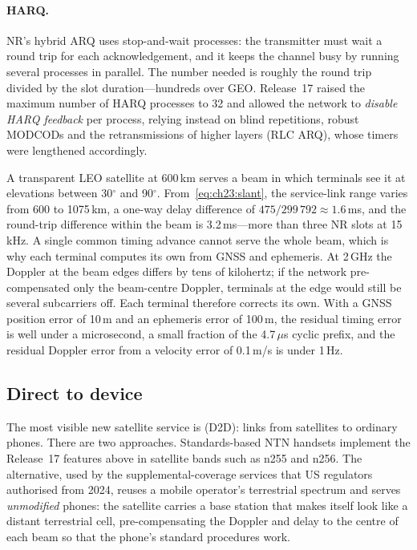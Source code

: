 \paragraph{HARQ.} NR's hybrid ARQ uses stop-and-wait processes: the transmitter must wait a round
trip for each acknowledgement, and it keeps the channel busy by running several processes in
parallel. The number needed is roughly the round trip divided by the slot duration---hundreds over
GEO. Release~17 raised the maximum number of HARQ processes to 32 and allowed the network to
\emph{disable HARQ feedback} per process, relying instead on blind repetitions, robust MODCODs and
the retransmissions of higher layers (RLC ARQ), whose timers were lengthened accordingly.

\begin{worked}
A transparent LEO satellite at 600\,km serves a beam in which terminals see it at elevations
between 30$^\circ$ and 90$^\circ$. From~\eqref{eq:ch23:slant}, the service-link range varies from
600 to 1075\,km, a one-way delay difference of $475/299\,792\approx1.6$\,ms, and the round-trip
difference within the beam is 3.2\,ms---more than three NR slots at 15\,kHz. A single common
timing advance cannot serve the whole beam, which is why each terminal computes its own from GNSS
and ephemeris. At 2\,GHz the Doppler at the beam edges differs by tens of kilohertz; if the network
pre-compensated only the beam-centre Doppler, terminals at the edge would still be several
subcarriers off. Each terminal therefore corrects its own. With a GNSS position error of 10\,m and
an ephemeris error of 100\,m, the residual timing error is well under a microsecond, a small
fraction of the 4.7\,$\mu$s cyclic prefix, and the residual Doppler error from a velocity error of
0.1\,m/s is under 1\,Hz.
\end{worked}


\subsection{Direct to device}

The most visible new satellite service is  (D2D): links from satellites to
ordinary phones. There are two approaches. Standards-based NTN handsets implement the Release~17
features above in satellite bands such as n255 and n256. The alternative, used by the
supplemental-coverage services that US regulators authorised from 2024, reuses a mobile
operator's terrestrial spectrum and serves \emph{unmodified} phones: the satellite carries a
base station that makes itself look like a distant terrestrial cell, pre-compensating the
Doppler and delay to the centre of each beam so that the phone's standard procedures work.

